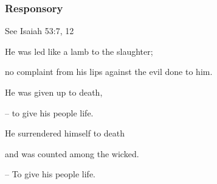 \subsubsection{Responsory}
\hfill See Isaiah 53:7, 12

He was led like a lamb to the slaughter;\par
no complaint from his lips against the evil done to him.\par
He was given up to death,\par
– to give his people life.\par
\vspace{5pt}
He surrendered himself to death\par
and was counted among the wicked.\par
– To give his people life.
